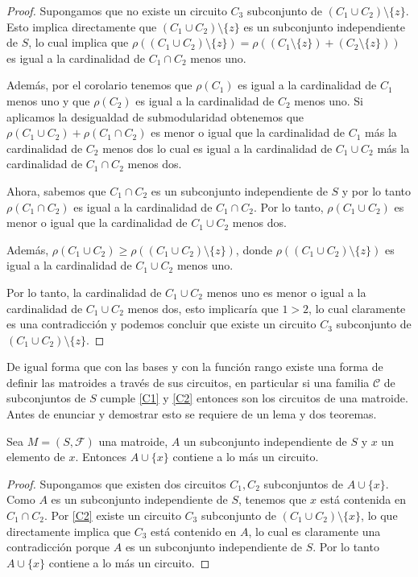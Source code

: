 \begin{proof}
Supongamos que no existe un circuito $C_3$ subconjunto de $(C_1 \cup C_2)\setminus \{z\}$. Esto implica directamente que $(C_1 \cup C_2)\setminus \{z\}$ es un subconjunto independiente de $S$, lo cual implica que $\rho((C_1 \cup C_2)\setminus \{z\}) = \rho((C_1 \setminus \{z\}) + (C_2 \setminus \{z\}) )$ es igual a la cardinalidad de $C_1 \cap C_2$ menos uno. 

Además, por el corolario \label{circ1} tenemos que $\rho(C_1)$ es igual a la cardinalidad de $C_1$ menos uno y que $\rho(C_2)$ es igual a la cardinalidad de $C_2$ menos uno. Si aplicamos la desigualdad de submodularidad obtenemos que $\rho(C_1 \cup C_2)+ \rho(C_1 \cap C_2 )$ es menor o igual que la cardinalidad de $C_1$ más la cardinalidad de $C_2$ menos dos lo cual es igual a la cardinalidad de $C_1 \cup C_2$ más la cardinalidad de $C_1 \cap C_2$ menos dos. 

Ahora, sabemos que $C_1 \cap C_2$ es un subconjunto independiente de $S$ y por lo tanto $\rho(C_1 \cap C_2)$ es igual a la cardinalidad de $C_1 \cap C_2$. Por lo tanto, $\rho(C_1 \cup C_2)$ es menor o igual que la cardinalidad de $C_1 \cup C_2$ menos dos. 

Además, $\rho(C_1 \cup C_2) \geq \rho((C_1 \cup C_2)\setminus \{z\})$, donde $\rho((C_1 \cup C_2)\setminus \{z\})$ es igual a la cardinalidad de $C_1 \cup C_2$ menos uno. 

Por lo tanto, la cardinalidad de $C_1 \cup C_2$ menos uno es menor o igual a la cardinalidad de $C_1 \cup C_2$ menos dos, esto implicaría que $1>2$, lo cual claramente es una contradicción y podemos concluir que existe un circuito $C_3$ subconjunto de $(C_1 \cup C_2)\setminus \{z\}$.
\end{proof}

De igual forma que con las bases y con la función rango existe una forma de definir las matroides a través de sus circuitos, en particular si una familia $\mathcal{C}$ de subconjuntos de $S$ cumple \ref{C1} y \ref{C2} entonces son los circuitos de una matroide. Antes de enunciar y demostrar esto se requiere de un lema y dos teoremas. 

\begin{lem} \label{lem circuitos}
Sea $M=(S,\mathcal{F})$ una matroide, $A$ un subconjunto independiente de $S$ y $x$ un elemento de $x$. Entonces $A \cup \{x\}$ contiene a lo más un circuito.
\end{lem}

\begin{proof}
Supongamos que existen dos circuitos $C_1,C_2$ subconjuntos de $A \cup \{x\}$. Como $A$ es un subconjunto independiente de $S$, tenemos que $x$ está contenida en $C_1 \cap C_2$. Por \ref{C2} existe un circuito $C_3$ subconjunto de $(C_1 \cup C_2)\setminus \{x\}$, lo que directamente implica que $C_3$ está contenido en $A$, lo cual es claramente una contradicción porque $A$ es un subconjunto independiente de $S$. Por lo tanto $A \cup \{x\}$ contiene a lo más un circuito.
\end{proof}

